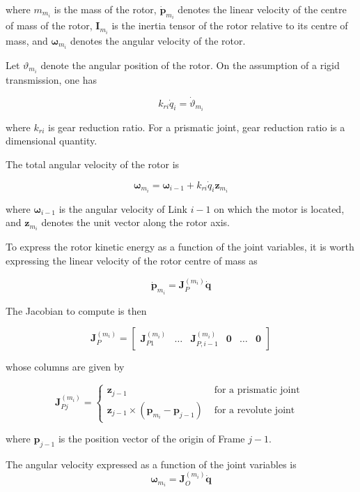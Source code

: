 \documentclass[10pt]{article}
\begin{document}
where $m_{m_{i}}$ is the mass of the rotor, $\dot{\boldsymbol{p}}_{m_{i}}$ denotes the linear velocity of the centre of mass of the rotor, $\boldsymbol{I}_{m_{i}}$ is the inertia tensor of the rotor relative to its centre of mass, and $\boldsymbol{\omega}_{m_{i}}$ denotes the angular velocity of the rotor.

Let $\vartheta_{m_{i}}$ denote the angular position of the rotor. On the assumption of a rigid transmission, one has

$$
k_{r i} \dot{q}_{i}=\dot{\vartheta}_{m_{i}}
$$

where $k_{r i}$ is  gear reduction ratio. For a prismatic joint,  gear reduction ratio is a dimensional quantity.

The total angular velocity of the rotor is

$$
\boldsymbol{\omega}_{m_{i}}=\boldsymbol{\omega}_{i-1}+k_{r i} \dot{q}_{i} \boldsymbol{z}_{m_{i}}
$$

where $\boldsymbol{\omega}_{i-1}$ is the angular velocity of Link $i-1$ on which the motor is located, and $\boldsymbol{z}_{m_{i}}$ denotes the unit vector along the rotor axis.

To express the rotor kinetic energy as a function of the joint variables, it is worth expressing the linear velocity of the rotor centre of mass as

$$
\dot{\boldsymbol{p}}_{m_{i}}=\boldsymbol{J}_{P}^{\left(m_{i}\right)} \dot{\boldsymbol{q}}
$$

The Jacobian to compute is then

$$
\boldsymbol{J}_{P}^{\left(m_{i}\right)}=\left[\begin{array}{llllll}
\boldsymbol{J}_{P 1}^{\left(m_{i}\right)} & \ldots & \boldsymbol{J}_{P, i-1}^{\left(m_{i}\right)} & \mathbf{0} & \ldots & \mathbf{0}
\end{array}\right]
$$

whose columns are given by

$$
\boldsymbol{J}_{P j}^{\left(m_{i}\right)}= \begin{cases}\boldsymbol{z}_{j-1} & \text { for a prismatic joint } \\ \boldsymbol{z}_{j-1} \times\left(\boldsymbol{p}_{m_{i}}-\boldsymbol{p}_{j-1}\right) & \text { for a revolute joint }\end{cases}
$$

where $\boldsymbol{p}_{j-1}$ is the position vector of the origin of Frame $j-1$. 

The angular velocity expressed as a function of the joint variables is
$$
\boldsymbol{\omega}_{m_{i}}=\boldsymbol{J}_{O}^{\left(m_{i}\right)} \dot{\boldsymbol{q}}
$$
\end{document}
